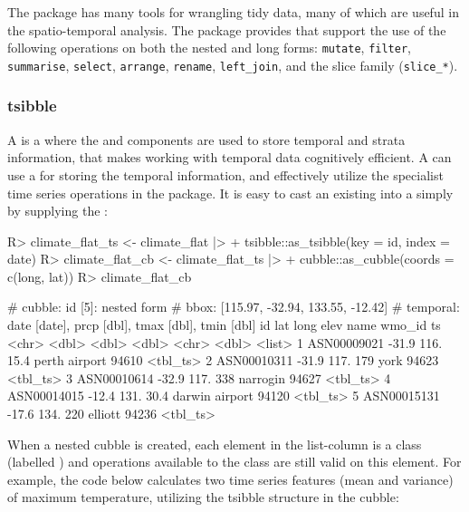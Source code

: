 \documentclass[
]{jss}
\begin{document}
The  package has many tools for wrangling tidy data, many of which are useful in the spatio-temporal analysis. The  package provides  that support the use of the following  operations on both the nested and long forms: \texttt{mutate}, \texttt{filter}, \texttt{summarise}, \texttt{select}, \texttt{arrange}, \texttt{rename}, \texttt{left\_join}, and the slice family (\texttt{slice\_*}).

\hypertarget{tsibble}{%
\subsubsection{tsibble}\label{tsibble}}

A  is a  where the  and  components are used to store temporal and strata information, that makes working with temporal data cognitively efficient. A  can use a  for storing the temporal information, and effectively utilize the specialist time series operations in the  package. It is easy to cast an existing  into a  simply by supplying the :

\begin{CodeChunk}
\begin{CodeInput}
R> climate_flat_ts <- climate_flat |> 
+   tsibble::as_tsibble(key = id, index = date)
R> climate_flat_cb <-  climate_flat_ts |> 
+   cubble::as_cubble(coords = c(long, lat))
R> climate_flat_cb
\end{CodeInput}
\begin{CodeOutput}
# cubble:   id [5]: nested form
# bbox:     [115.97, -32.94, 133.55, -12.42]
# temporal: date [date], prcp [dbl], tmax [dbl], tmin [dbl]
  id            lat  long  elev name           wmo_id ts      
  <chr>       <dbl> <dbl> <dbl> <chr>           <dbl> <list>  
1 ASN00009021 -31.9  116.  15.4 perth airport   94610 <tbl_ts>
2 ASN00010311 -31.9  117. 179   york            94623 <tbl_ts>
3 ASN00010614 -32.9  117. 338   narrogin        94627 <tbl_ts>
4 ASN00014015 -12.4  131.  30.4 darwin airport  94120 <tbl_ts>
5 ASN00015131 -17.6  134. 220   elliott         94236 <tbl_ts>
\end{CodeOutput}
\end{CodeChunk}

When a nested cubble is created, each element in the list-column  is a  class (labelled ) and operations available to the  class are still valid on this element. For example, the code below calculates two time series features (mean and variance) of maximum temperature, utilizing the tsibble structure in the cubble:
\end{document}
